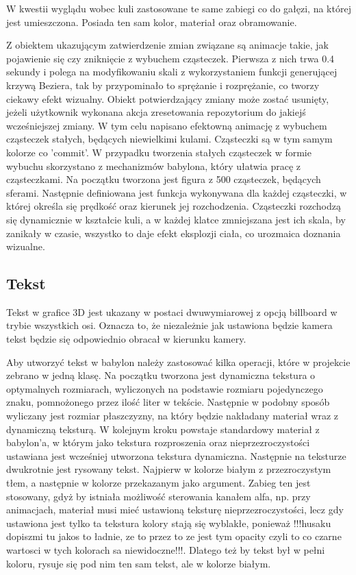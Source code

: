 \documentclass[11pt,a4paper,polish,thesis]{dcsbook}
\begin{document}
	 W kwestii wyglądu wobec kuli zastosowane te same zabiegi co do gałęzi, na której jest umieszczona. Posiada ten sam kolor, materiał oraz obramowanie. 
 
	Z obiektem ukazującym zatwierdzenie zmian związane są animacje takie, jak pojawienie się czy zniknięcie z wybuchem cząsteczek. Pierwsza z nich trwa 0.4 sekundy i polega na modyfikowaniu skali z wykorzystaniem funkcji generującej krzywą Beziera, tak by przypominało to sprężanie i rozprężanie, co tworzy ciekawy efekt wizualny. Obiekt potwierdzający zmiany może zostać usunięty, jeżeli użytkownik wykonana akcja zresetowania repozytorium do jakiejś wcześniejszej zmiany. W tym celu napisano efektowną animację z wybuchem cząsteczek stałych, będących niewielkimi kulami. Cząsteczki są w tym samym kolorze co 'commit'. W przypadku tworzenia stałych cząsteczek w formie wybuchu skorzystano z mechanizmów babylona, który ułatwia pracę z cząsteczkami. Na początku tworzona jest figura z 500 cząsteczek, będących sferami. Następnie definiowana jest funkcja wykonywana dla każdej cząsteczki, w której określa się prędkość oraz kierunek jej rozchodzenia. Cząsteczki rozchodzą się dynamicznie w kształcie kuli, a w każdej klatce zmniejszana jest ich skala, by zanikały w czasie, wszystko to daje efekt eksplozji ciała, co urozmaica doznania wizualne. 
 
	\subsection{Tekst}
	Tekst w grafice 3D jest ukazany w postaci dwuwymiarowej z opcją billboard w trybie  wszystkich osi. Oznacza to, że niezależnie jak ustawiona będzie kamera tekst będzie się odpowiednio obracał w kierunku kamery. 

	Aby utworzyć tekst w babylon należy zastosować kilka operacji, które w projekcie zebrano w jedną klasę. Na początku tworzona jest dynamiczna tekstura o optymalnych rozmiarach, wyliczonych na podstawie rozmiaru pojedynczego znaku, pomnożonego przez ilość liter w tekście. Następnie w podobny sposób wyliczany jest rozmiar płaszczyzny, na który będzie nakładany materiał wraz z dynamiczną teksturą. W kolejnym kroku powstaje standardowy materiał z babylon'a, w którym jako tekstura rozproszenia oraz nieprzezroczystości ustawiana jest wcześniej utworzona tekstura dynamiczna. Następnie na teksturze dwukrotnie jest rysowany tekst. Najpierw w kolorze białym z przezroczystym tłem, a następnie w kolorze przekazanym jako argument. Zabieg ten jest stosowany, gdyż by istniała możliwość sterowania kanałem alfa, np. przy animacjach, materiał musi mieć ustawioną teksturę nieprzezroczystości, lecz gdy ustawiona jest tylko ta tekstura kolory stają się wyblakłe, ponieważ !!!husaku dopiszmi tu jakos to ładnie, ze to przez to ze jest tym opacity czyli to co czarne wartosci w tych kolorach sa niewidoczne!!!.
	Dlatego też by tekst był w pełni koloru, rysuje się pod nim ten sam tekst, ale w kolorze białym.
	
\end{document}

